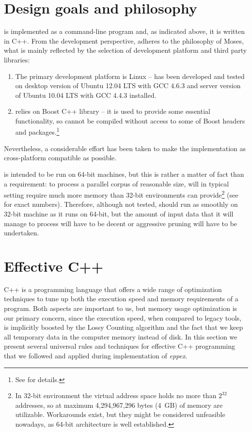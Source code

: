 \section{Design goals and philosophy}

\Eppex{} is implemented as a command-line program and, as indicated above, it is written in C++.
From the development perspective, \eppex{} adheres to the philosophy of Moses, what is mainly
reflected by the selection of development platform and third party libraries:
\begin{enumerate}
  \item The primary development platform is Linux --
  \eppex{} has been developed and tested on desktop version of Ubuntu 12.04 LTS with GCC 4.6.3 and
  server version of Ubuntu 10.04 LTS with GCC 4.4.3 installed.
  \item \Eppex{} relies on Boost C++ library -- it is used to provide
  some essential functionality, so \eppex{} cannot be compiled without access to some of Boost
  headers and packages.\footnote{See  for details.}
\end{enumerate}
Nevertheless, a considerable effort has been taken to make the implementation as cross-platform
compatible as possible.

\Eppex{} is intended to be run on 64-bit machines, but this is rather a matter of fact than
a requirement: to process a parallel corpus of reasonable size, \eppex{} will in typical
setting require much more memory than 32-bit environments can provide\footnote{In 32-bit
environment the virtual address space holds no more than $2^{32}$ addresses, so at maximum
4,294,967,296 bytes (4~GB) of memory are utilizable. Workarounds exist, but they might be
considered unfeasible nowadays, as 64-bit architecture is well established.} (see 
for exact numbers).
Therefore, although not tested, \eppex{} should run as smoothly on 32-bit machine as it runs
on 64-bit, but the amount of input data that it will manage to process will have to be decent
or aggressive pruning will have to be undertaken.

\section{Effective C++}

C++ is a programming language that offers a wide range of optimization techniques to
tune up both the execution speed and memory requirements of a program.
Both aspects are important to us, but memory usage optimization is our primary concern,
since the execution speed, when compared to legacy tools, is implicitly boosted by
the Lossy Counting algorithm and the fact that we keep all temporary data in the computer
memory instead of disk.
In this section we present several universal rules and techniques for effective C++
programming that we followed and applied during implementation of \emph{eppex}.

